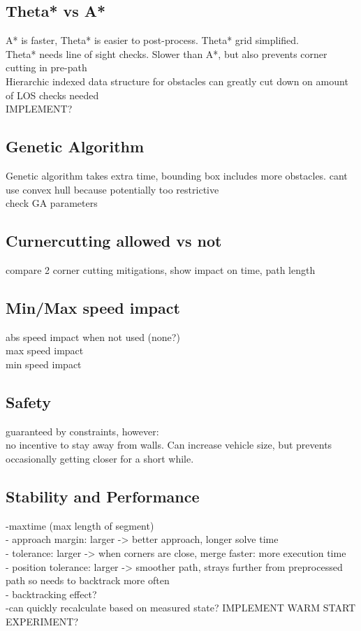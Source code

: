 \subsection{Theta* vs A*}
A* is faster, Theta* is easier to post-process. Theta* grid simplified.\\
Theta* needs line of sight checks. Slower than A*, but also prevents corner cutting in pre-path\\
Hierarchic indexed data structure for obstacles can greatly cut down on amount of LOS checks needed \\ IMPLEMENT?
\subsection{Genetic Algorithm}
Genetic algorithm takes extra time, bounding box includes more obstacles. cant use convex hull because potentially too restrictive\\
check GA parameters\\
\subsection{Curnercutting allowed vs not}
compare 2 corner cutting mitigations, show impact on time, path length\\
\subsection{Min/Max speed impact}
abs speed impact when not used (none?)\\
max speed impact\\
min speed impact\\
\subsection{Safety}
guaranteed by constraints, however:\\
no incentive to stay away from walls. Can increase vehicle size, but prevents occasionally getting closer for a short while.\\
\subsection{Stability and Performance}
-maxtime (max length of segment)\\
- approach margin: larger -> better approach, longer solve time\\
- tolerance: larger -> when corners are close, merge faster: more execution time\\
- position tolerance: larger -> smoother path, strays further from preprocessed path so needs to backtrack more often\\
- backtracking effect?\\
-can quickly recalculate based on measured state? IMPLEMENT WARM START EXPERIMENT?\\
